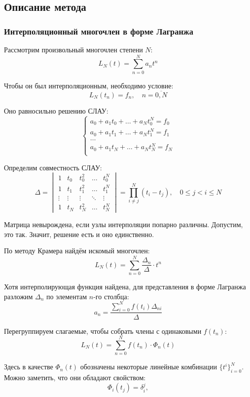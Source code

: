 \subsection{Описание метода}

\subsubsection{Интерполяционный многочлен в форме Лагранжа}

Рассмотрим произвольный многочлен степени \( N \):
\[
  L_N(t)=\sum_{n=0}^N a_nt^n
\]

Чтобы он был интерполяционным, необходимо условие:
\[
  L_N(t_n)=f_n,\quad n=\overline{0,N}
\]

Оно равносильно решению СЛАУ:
\[
  \begin{cases}
    a_0+a_1t_0+\ldots+a_Nt_0^N=f_0\\
    a_0+a_1t_1+\ldots+a_Nt_1^N=f_1\\
    \dots\\
    a_0+a_1t_N+\ldots+a_Nt_N^N=f_N\\
  \end{cases}
\]

Определим совместность СЛАУ:
\[
  \Delta = \begin{vmatrix}
  1 & t_0 & t_0^2 & \dots & t_0^N \\
  1 & t_1 & t_1^2 & \dots & t_1^N \\
  \vdots & \vdots & \vdots & \ddots & \vdots \\
  1 & t_N & t_N^2 & \dots & t_N^N
  \end{vmatrix} = \prod_{i \neq j}^{N} (t_i - t_j), \quad 0 \le j < i \le N
\]

Матрица невырождена, если узлы интерполяции попарно различны. Допустим, это так. Значит, решение есть и оно единственно.

По методу Крамера найдём искомый многочлен:
\[
  L_N(t)=\sum_{n=0}^N\dfrac{\Delta_n}{\Delta}\cdot t^n
\]

Хотя интерполирующая функция найдена, для представления в форме Лагранжа разложим \( \Delta_n \) по элементам \( n \)-го столбца:
\[
  a_n=\dfrac{\sum_{i=0}^Nf(t_i)\Delta_{ni}}{\Delta}
\]

Перегруппируем слагаемые, чтобы собрать члены с одинаковыми \( f(t_n) \):
\[
  L_N(t)=\sum_{n=0}^Nf(t_n)\cdot\Phi_n(t)
\]

Здесь в качестве \( \Phi_n(t) \) обозначены некоторые линейные комбинации \( \{t^i\}^N_{i=0} \). Можно заметить, что они обладают свойством:
\[
  \Phi_i(t_j)=\delta_i^j,
\]

